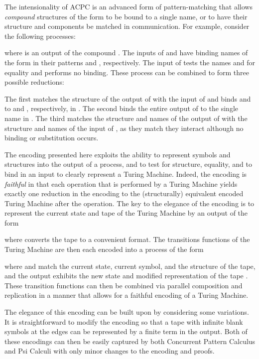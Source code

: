 \documentclass[submission,copyright,creativecommons]{eptcs}
\begin{document}
The intensionality of ACPC is an advanced form of pattern-matching
that allows {\em compound} structures of the form  to be bound to a single
name, or to have their structure and components be matched in communication.
For example, consider the following processes:

where  is an output of the compound .
The inputs of  and  have binding names of the form  in their
patterns  and , respectively.
The input of  tests the names  and  for equality and performs no binding.
These process can be combined to form three possible reductions:

The first matches the structure of the output of  with the input of  and binds
 and  to  and , respectively, in .
The second binds the entire output of  to the single name  in .
The third matches the structure and names of the output of  with the structure
and names of the input of , as they match they interact although no binding
or substitution occurs.

The encoding presented here exploits the ability to represent symbols and structures
into the output of a process, and to test for structure, equality, and to bind in
an input to clearly represent a Turing Machine.
Indeed, the encoding is {\em faithful} in that each operation that is performed
by a Turing Machine yields exactly one reduction in the encoding to the (structurally)
equivalent encoded Turing Machine after the operation.
The key to the elegance of the encoding is to represent the current state  and
tape  of the Turing Machine by an output of the form

where  converts the tape to a convenient format.
The transitions functions of the Turing Machine are then each encoded into
a process of the form

where  and  match the current state, current symbol, and the structure of the
tape, and the output exhibits the new state  and modified representation of the tape .
These transition functions can then be combined via parallel composition and replication
in a manner that allows for a faithful encoding of a Turing Machine.


The elegance of this encoding can be built upon by considering some variations.
It is straightforward to modify the encoding so that a tape with infinite blank symbols
at the edges can be represented by a finite term in the output.
Both of these encodings can then be easily captured by both Concurrent Pattern Calculus
and Psi Calculi with only minor changes to the encoding and proofs.
\end{document}

